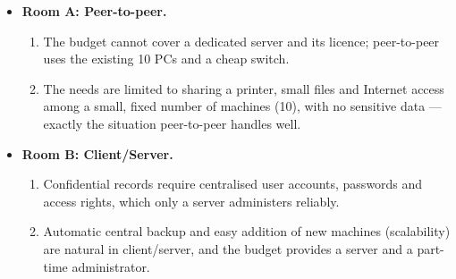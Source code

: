 \documentclass[11pt]{article}
\begin{document}
\begin{exemplebox}
\begin{itemize}
\item \textbf{Room A: Peer-to-peer.}
      \begin{enumerate}
      \item The budget cannot cover a dedicated server and its licence; peer-to-peer uses the existing 10 PCs and a cheap switch.
      \item The needs are limited to sharing a printer, small files and Internet access among a small, fixed number of machines (10), with no sensitive data --- exactly the situation peer-to-peer handles well.
      \end{enumerate}
\item \textbf{Room B: Client/Server.}
      \begin{enumerate}
      \item Confidential records require centralised user accounts, passwords and access rights, which only a server administers reliably.
      \item Automatic central backup and easy addition of new machines (scalability) are natural in client/server, and the budget provides a server and a part-time administrator.
      \end{enumerate}
\end{itemize}
\end{exemplebox}
\end{document}
